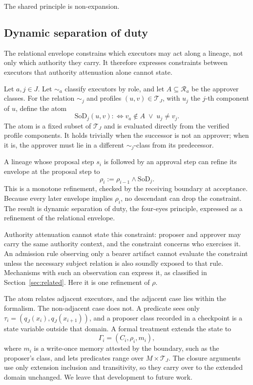 \documentclass[10pt,twocolumn]{article}
\newcommand{\Rel}{\mathcal{R}}
\newcommand{\Transitions}{\mathcal{T}}
\begin{document}
The shared principle is non-expansion.

\subsection{Dynamic separation of duty}
\label{sec:sod}

The relational envelope constrains which executors may act along a lineage, not
only which authority they carry. It therefore expresses constraints between
executors that authority attenuation alone cannot state.

Let \(a,j\in J\). Let \(\sim_a\) classify executors by role, and let
\(A\subseteq\Rel_a\) be the approver classes. For the relation \(\sim_j\) and
profiles \((u,v)\in\Transitions_J\),
with \(u_j\) the \(j\)-th component of \(u\), define the atom
\[
\mathrm{SoD}_j(u,v)
:\Longleftrightarrow
v_a\notin A
\;\lor\;
u_j\neq v_j.
\]
The atom is a fixed subset of \(\Transitions_J\) and is evaluated directly from
the verified profile components.
It holds trivially when the successor is not an approver; when it is, the
approver must lie in a different \(\sim_j\)-class from its predecessor.

A lineage whose proposal step \(s_i\) is followed by an approval step can refine
its envelope at the proposal step to
\[
\rho_i:=\rho_{i-1}\land\mathrm{SoD}_j.
\]
This is a monotone refinement, checked by the receiving boundary at acceptance.
Because every later envelope implies \(\rho_i\), no descendant can drop the
constraint. The result is dynamic separation of duty, the four-eyes principle,
expressed as a refinement of the relational envelope.

Authority attenuation cannot state this constraint: proposer and approver may
carry the same authority context, and the constraint concerns who exercises it.
An admission rule observing only a bearer artifact cannot evaluate the
constraint unless the necessary subject relation is also soundly exposed to
that rule. Mechanisms with such an observation can express it, as classified in
Section~\ref{sec:related}. Here it is one refinement of \(\rho\).

The atom relates adjacent executors, and the adjacent case lies within the
formalism. The non-adjacent case does not. A predicate sees only
\(\tau_i=(q_J(x_i),q_J(x_{i+1}))\), and a proposer class recorded in a
checkpoint is a state variable outside that domain. A formal treatment extends
the state to
\[
\Gamma_i=(C_i,\rho_i,m_i),
\]
where \(m_i\) is a write-once memory attested by the boundary, such as the
proposer's class, and lets predicates range over \(M\times\Transitions_J\). The
closure arguments use only extension inclusion and transitivity, so they carry
over to the extended domain unchanged. We leave that development to future
work.
\end{document}
